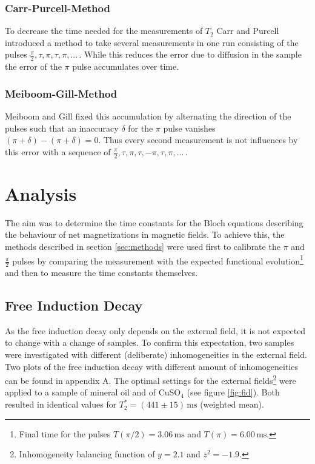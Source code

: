 \documentclass[a4paper]{scrartcl}
\numberwithin{equation}{section}
\numberwithin{figure}{section}
\numberwithin{table}{section}
\begin{document}
\subsubsection*{Carr-Purcell-Method}
To decrease the time needed for the measurements of $T_2$ Carr and Purcell introduced a method to take several measurements in one run consisting of the pulses $\frac{\pi}{2},\tau,\pi,\tau,\pi,...\,$. While this reduces the error due to diffusion in the sample the error of the $\pi$ pulse accumulates over time.

\subsubsection*{Meiboom-Gill-Method}
Meiboom and Gill fixed this accumulation by alternating the direction of the pulses such that an inaccuracy $\delta$ for the $\pi$ pulse vanishes $(\pi+\delta)-(\pi+\delta)=0$. Thus every second measurement is not influences by this error with a sequence of $\frac{\pi}{2},\tau,\pi,\tau,-\pi,\tau,\pi,...\,$.


\clearpage
\section{Analysis}
The aim was to determine the time constants for the Bloch equations describing the behaviour of net magnetizations in magnetic fields. To achieve this, the methods described in section \ref{sec:methods} were used first to calibrate the $\pi$ and $\frac{\pi}{2}$ pulses by comparing the measurement with the expected functional evolution\footnote{Final time for the pulses $T\left(\pi/2\right) = 3.06\,\text{ms}$ and $T\left(\pi\right) = 6.00\,\text{ms}$.} and then to measure the time constants themselves.

\subsection{Free Induction Decay}
As the free induction decay only depends on the external field, it is not expected to change with a change of samples. To confirm this expectation, two samples were investigated with different (deliberate) inhomogeneities in the external field. Two plots of the free induction decay with different amount of inhomogeneities can be found in appendix A. The optimal settings for the external fields\footnote{Inhomogeneity balancing function of $y=2.1$ and $z^2 = -1.9$.} were applied to a sample of mineral oil and of CuSO$_4$ (see figure \ref{fig:fid}). Both resulted in identical values for $T_2^* = (441\pm 15)\,\text{ms}$ (weighted mean).
\end{document}
